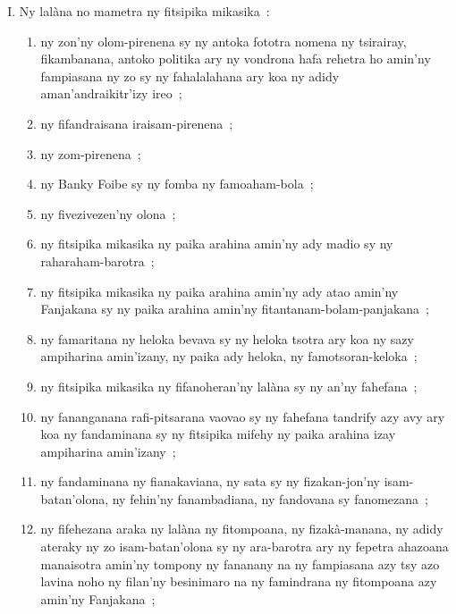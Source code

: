 \documentclass[12pt]{article}
\begin{document}
\begin{enumerate}[I.]
\item Ny lalàna no mametra ny fitsipika mikasika~:
  \begin{enumerate}[1.]
  \item ny zon'ny olom-pirenena sy ny antoka fototra nomena ny tsirairay,
    fikambanana, antoko politika ary ny vondrona hafa rehetra ho amin'ny
    fampiasana ny zo sy ny fahalalahana ary koa ny adidy aman'andraikitr'izy
    ireo~;

  \item ny fifandraisana iraisam-pirenena~;

  \item ny zom-pirenena~;

  \item ny Banky Foibe sy ny fomba ny famoaham-bola~;

  \item ny fivezivezen'ny olona~;

  \item ny fitsipika mikasika ny paika arahina amin'ny ady madio sy ny
    raharaham-barotra~;

  \item ny fitsipika mikasika ny paika arahina amin'ny ady atao amin'ny
    Fanjakana sy ny paika arahina amin'ny fitantanam-bolam-panjakana~;

  \item ny famaritana ny heloka bevava sy ny heloka tsotra ary koa ny sazy
    ampiharina amin'izany, ny paika ady heloka, ny famotsoran-keloka~;

  \item ny fitsipika mikasika ny fifanoheran'ny lalàna sy ny an'ny fahefana~;

  \item ny fananganana rafi-pitsarana vaovao sy ny fahefana tandrify azy avy ary
    koa ny fandaminana sy ny fitsipika mifehy ny paika arahina izay ampiharina
    amin'izany~;

  \item ny fandaminana ny fianakaviana, ny sata sy ny fizakan-jon'ny
    isam-batan'olona, ny fehin'ny fanambadiana, ny fandovana sy fanomezana~;

  \item ny fifehezana araka ny lalàna ny fitompoana, ny fizakà-manana, ny adidy
    ateraky ny zo isam-batan'olona sy ny ara-barotra ary ny fepetra ahazoana
    manaisotra amin'ny tompony ny fananany na ny fampiasana azy tsy azo lavina
    noho ny filan'ny besinimaro na ny famindrana ny fitompoana azy amin'ny
    Fanjakana~;


\end{enumerate}
\end{enumerate}
\end{document}
